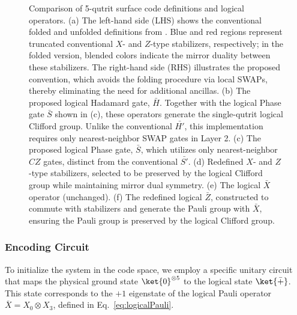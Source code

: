 \begin{figure}[H]
\caption{Comparison of 5-qutrit surface code definitions and logical operators. 
(a) The left-hand side (LHS) shows the conventional folded and unfolded definitions from \cite{Moussa2016}. Blue and red regions represent truncated conventional $X$- and $Z$-type stabilizers, respectively; in the folded version, blended colors indicate the mirror duality between these stabilizers. The right-hand side (RHS) illustrates the proposed convention, which avoids the folding procedure via local SWAPs, thereby eliminating the need for additional ancillas. 
(b) The proposed logical Hadamard gate, $\bar{H}$. Together with the logical Phase gate $\bar{S}$ shown in (c), these operators generate the single-qutrit logical Clifford group. Unlike the conventional $\bar{H'}$, this implementation requires only nearest-neighbor SWAP gates in Layer 2. 
(c) The proposed logical Phase gate, $\bar{S}$, which utilizes only nearest-neighbor $CZ$ gates, distinct from the conventional $\bar{S'}$. 
(d) Redefined $X$- and $Z$-type stabilizers, selected to be preserved by the logical Clifford group while maintaining mirror dual symmetry. 
(e) The logical $\bar{X}$ operator (unchanged). 
(f) The redefined logical $\bar{Z}$, constructed to commute with stabilizers and generate the Pauli group with $\bar{X}$, ensuring the Pauli group is preserved by the logical Clifford group.}
\label{fig: 5-qutrit-code}

\end{figure}

\subsubsection{Encoding Circuit}

To initialize the system in the code space, we employ a specific unitary circuit that maps the physical ground state $\ket{0}^{\otimes 5}$ to the logical state $\ket{\bar{+}}$. This state corresponds to the $+1$ eigenstate of the logical Pauli operator $\overline{X} = X_0 \otimes X_3$, defined in Eq.~\eqref{eq:logicalPauli}.

